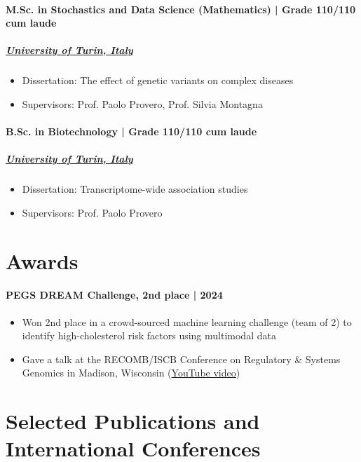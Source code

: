 \documentclass[
	DIV=23,
]{scrartcl}
\begin{document}
\paragraph{M.Sc. in Stochastics and Data Science (Mathematics) | Grade 110/110 cum laude}
\subparagraph{\href{https://unito.it}{University of Turin, Italy}}
\begin{itemize}
	\item Dissertation: The effect of genetic variants on complex diseases
	\item Supervisors: Prof. Paolo Provero, Prof. Silvia Montagna
\end{itemize}

\paragraph{B.Sc. in Biotechnology | Grade 110/110 cum laude}
\subparagraph{\href{https://unito.it}{University of Turin, Italy}}
\begin{itemize}
	\item Dissertation: Transcriptome-wide association studies
	\item Supervisors: Prof. Paolo Provero
\end{itemize}

\section*{Awards}

\paragraph{PEGS DREAM Challenge, 2nd place | 2024}
\begin{itemize}
	\item Won 2nd place in a crowd-sourced machine learning challenge (team of 2) to identify high-cholesterol risk factors using multimodal data
	\item Gave a talk at the RECOMB/ISCB Conference on Regulatory \& Systems Genomics in Madison, Wisconsin (\href{https://www.youtube.com/watch?v=QCDiowWxeJM}{YouTube video})
\end{itemize}

\section*{Selected Publications and International Conferences}
\end{document}
